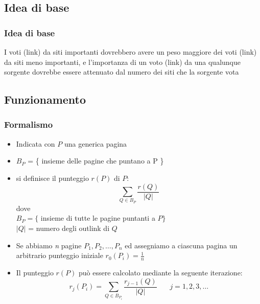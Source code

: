 \documentclass{beamer}
\begin{document}
\subsection{Idea di base}
\begin{frame}
	\frametitle{Idea di base}
	I voti (link) da siti importanti dovrebbero avere un peso maggiore dei voti (link) da siti meno importanti, e l'importanza di un voto (link) da una qualunque sorgente dovrebbe essere attenuato dal numero dei siti che la sorgente vota
\end{frame}

\subsection{Funzionamento}
\begin{frame}
	\frametitle{Formalismo}
	\begin{itemize}
		\item Indicata con $P$ una generica pagina
		\item $B_P$ = \{ insieme delle pagine che puntano a P \}
		\item si definisce il punteggio $r(P)$ di $P$: $$\sum_{Q \in B_P}\frac{r(Q)}{|Q|}$$ dove \\ $B_P=\{$ insieme di tutte le pagine puntanti a $P\}$ \\ $|Q|$ = numero degli outlink di $Q$
	\end{itemize}
\end{frame}


\begin{frame}
	\begin{itemize}
		\item Se abbiamo \emph{n} pagine $P_1,P_2,\dots,P_n$ ed assegniamo a ciascuna pagina un arbitrario punteggio iniziale $r_0(P_i)=\frac{1}{n}$
		\item Il punteggio $r(P)$ può essere calcolato mediante la seguente iterazione: $$r_j(P_i)= \sum_{Q \in B_{P_i}}\frac{r_{j-1}(Q)}{|Q|} ~~~~~~~~ j=1,2,3,\dots$$
	\end{itemize}
\end{frame}


\end{document}
